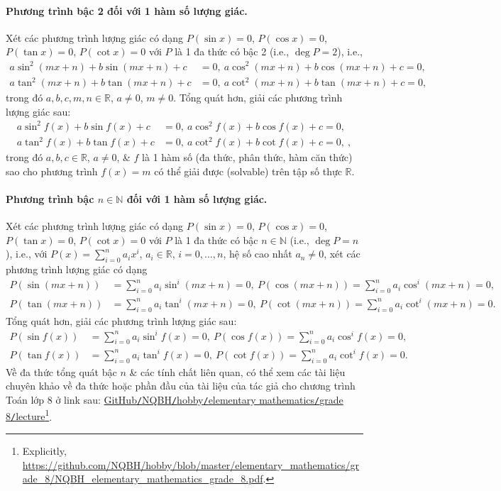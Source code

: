 \documentclass[oneside]{book}
\numberwithin{equation}{section}
\begin{document}
\paragraph{Phương trình bậc 2 đối với 1 hàm số lượng giác.} Xét các phương trình lượng giác có dạng $P(\sin x) = 0$, $P(\cos x) = 0$, $P(\tan x) = 0$, $P(\cot x) = 0$ với $P$ là 1 đa thức có bậc 2 (i.e., $\deg P = 2$), i.e.,
\begin{align*}
	a\sin^2(mx + n) + b\sin(mx + n) + c &= 0,\ a\cos^2(mx + n) + b\cos(mx + n) + c = 0,\\
	a\tan^2(mx + n) + b\tan(mx + n) + c &= 0,\ a\cot^2(mx + n) + b\tan(mx + n) + c = 0,\ 
\end{align*}
trong đó $a,b,c,m,n\in\mathbb{R}$, $a\ne 0$, $m\ne 0$. Tổng quát hơn, giải các phương trình lượng giác sau:
\begin{align*}
	a\sin^2f(x) + b\sin f(x) + c &= 0,\ a\cos^2f(x) + b\cos f(x) + c = 0,\\
	a\tan^2f(x) + b\tan f(x) + c &= 0,\ a\cot^2f(x) + b\cot f(x) + c = 0,\ ,
\end{align*}
trong đó $a,b,c\in\mathbb{R}$, $a\ne 0$, \& $f$ là 1 hàm số (đa thức, phân thức, hàm căn thức) sao cho phương trình $f(x) = m$ có thể giải được (solvable) trên tập số thực $\mathbb{R}$. 

\paragraph{Phương trình bậc $n\in\mathbb{N}$ đối với 1 hàm số lượng giác.} Xét các phương trình lượng giác có dạng $P(\sin x) = 0$, $P(\cos x) = 0$, $P(\tan x) = 0$, $P(\cot x) = 0$ với $P$ là 1 đa thức có bậc $n\in\mathbb{N}$ (i.e., $\deg P = n$), i.e., với $P(x) = \sum_{i=0}^n a_ix^i$, $a_i\in\mathbb{R}$, $i = 0,\ldots,n$, hệ số cao nhất $a_n\ne 0$, xét các phương trình lượng giác có dạng
\begin{align*}
	P(\sin(mx + n)) &= \sum_{i=0}^n a_i\sin^i(mx + n) = 0,\ P(\cos(mx + n)) = \sum_{i=0}^n a_i\cos^i(mx + n)  = 0,\\
	P(\tan(mx + n)) &= \sum_{i=0}^n a_i\tan^i(mx + n)  = 0,\ P(\cot(mx + n)) = \sum_{i=0}^n a_i\cot^i(mx + n) = 0.
\end{align*}
Tổng quát hơn, giải các phương trình lượng giác sau:
\begin{align*}
	P(\sin f(x)) &= \sum_{i=0}^n a_i\sin^if(x) = 0,\ P(\cos f(x)) = \sum_{i=0}^n a_i\cos^if(x) = 0,\\
	P(\tan f(x)) &= \sum_{i=0}^n a_i\tan^if(x) = 0,\ P(\cot f(x)) = \sum_{i=0}^n a_i\cot^if(x) = 0.
\end{align*}
Về đa thức tổng quát bậc $n$ \& các tính chất liên quan, có thể xem các tài liệu chuyên khảo về đa thức hoặc phần đầu của tài liệu của tác giả cho chương trình Toán lớp 8 ở link sau: \href{https://github.com/NQBH/hobby/blob/master/elementary_mathematics/grade_8/NQBH_elementary_mathematics_grade_8.pdf}{GitHub\texttt{/}NQBH\texttt{/}hobby\texttt{/}elementary mathematics\texttt{/}grade 8\texttt{/}lecture}\footnote{Explicitly, \url{https://github.com/NQBH/hobby/blob/master/elementary_mathematics/grade_8/NQBH_elementary_mathematics_grade_8.pdf}.}.
\end{document}
